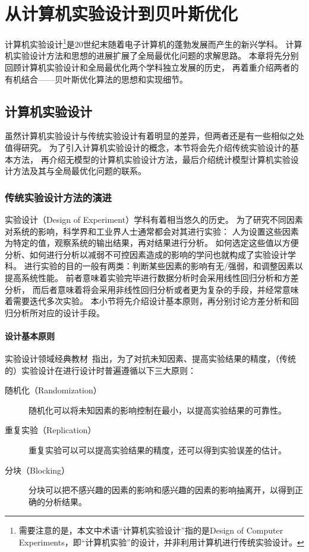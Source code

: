 \documentclass[index]{subfiles}
\begin{document}
\chapter{从计算机实验设计到贝叶斯优化}
计算机实验设计\footnote{需要注意的是，本文中术语“计算机实验设计”指的是Design of Computer Experiments，即“计算机实验”的设计，并非利用计算机进行传统实验设计。}是20世纪末随着电子计算机的蓬勃发展而产生的新兴学科\cite{mckay1979}。
计算机实验设计方法和思想的进展扩展了全局最优化问题的求解思路。
本章将先分别回顾计算机实验设计和全局最优化两个学科独立发展的历史，
再着重介绍两者的有机结合——贝叶斯优化算法的思想和实现细节。

\section{计算机实验设计}
虽然计算机实验设计与传统实验设计有着明显的差异，但两者还是有一些相似之处值得研究。
为了引入计算机实验设计的概念，本节将会先介绍传统实验设计的基本方法，
再介绍无模型的计算机实验设计方法，最后介绍统计模型计算机实验设计方法及其与全局最优化问题的联系。

\subsection{传统实验设计方法的演进}
实验设计（Design of Experiment）学科有着相当悠久的历史。
为了研究不同因素对系统的影响，科学界和工业界人士通常都会对其进行实验：
人为设置这些因素为特定的值，观察系统的输出结果，再对结果进行分析。
如何选定这些值以方便分析、如何进行分析以减弱不可控因素造成的影响的学问也就构成了实验设计学科\cite{davies1954}。
进行实验的目的一般有两类：判断某些因素的影响有无/强弱，和调整因素以提高系统性能。
前者意味着实验完毕进行数据分析时会采用线性回归分析和方差分析，
而后者意味着将会采用非线性回归分析或者更为复杂的手段，并经常意味着需要迭代多次实验。
本小节将先介绍设计基本原则，再分别讨论方差分析和回归分析所对应的设计手段。

\subsubsection{设计基本原则}
实验设计领域经典教材~指出，为了对抗未知因素、提高实验结果的精度，（传统的）实验设计在进行设计时普遍遵循以下三大原则：
\begin{description}
  \item[随机化（Randomization）] 随机化可以将未知因素的影响控制在最小，以提高实验结果的可靠性。
  \item[重复实验（Replication）] 重复实验可以可以提高实验结果的精度，还可以得到实验误差的估计。
  \item[分块（Blocking）] 分块可以把不感兴趣的因素的影响和感兴趣的因素的影响抽离开，以得到正确的分析结果。
\end{description}
\end{document}
